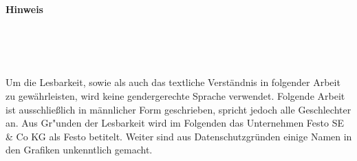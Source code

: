\begin{titlepage}
\begin{center}
\Huge\bf Hinweis\\
\end{center} $~$\\\\\\
\begin{center}
Um die Lesbarkeit, sowie als auch das textliche Verständnis in folgender Arbeit zu gewährleisten, wird keine gendergerechte Sprache verwendet. Folgende Arbeit ist ausschließlich in männlicher Form geschrieben, spricht jedoch alle Geschlechter an. 
\newline
\newline
Aus Gr"unden der Lesbarkeit wird im Folgenden das Unternehmen Festo SE \& Co KG als Festo betitelt. Weiter sind aus Datenschutzgründen einige Namen in den Grafiken unkenntlich gemacht.
\newline
\newline

\end{center}
\end{titlepage}